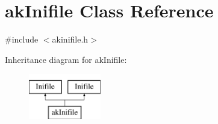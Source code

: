 \hypertarget{classakInifile}{\section{ak\-Inifile Class Reference}
\label{classakInifile}
}


{\ttfamily \#include $<$akinifile.\-h$>$}

Inheritance diagram for ak\-Inifile\-:\begin{figure}[H]
\begin{center}
\leavevmode
\includegraphics[height=2.000000cm]{classakInifile}
\end{center}
\end{figure}
